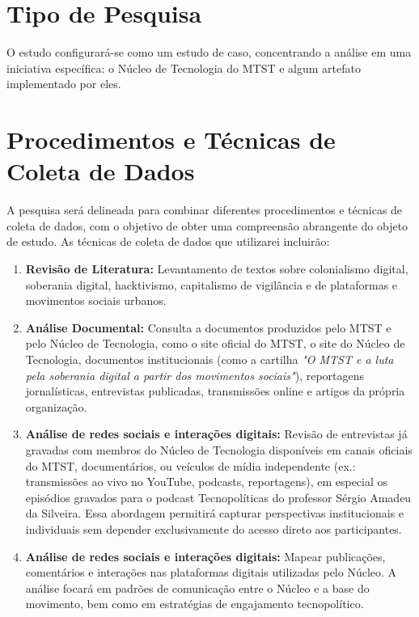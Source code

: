 \section{Tipo de Pesquisa}

O estudo configurará-se como um estudo de caso, concentrando a análise em uma iniciativa específica: o Núcleo de Tecnologia do MTST e algum artefato implementado por eles.

\section{Procedimentos e Técnicas de Coleta de Dados}

A pesquisa será delineada para combinar diferentes procedimentos e técnicas de coleta de dados, com o objetivo de obter uma compreensão abrangente do objeto de estudo. As técnicas de coleta de dados que utilizarei incluirão:

\begin{enumerate}

    \item \textbf{Revisão de Literatura:} \label{item:revisao} Levantamento de textos sobre colonialismo digital, soberania digital, hacktivismo, capitalismo de vigilância e de plataformas e movimentos sociais urbanos.

    \item \textbf{Análise Documental:}  \label{item:documental} Consulta a documentos produzidos pelo MTST e pelo Núcleo de Tecnologia, como o site oficial do MTST, o site do Núcleo de Tecnologia, documentos institucionais (como a cartilha \textit{"O MTST e a luta pela soberania digital a partir dos movimentos sociais"}), reportagens jornalísticas, entrevistas publicadas, transmissões online e artigos da própria organização. 

    \item \textbf{Análise de redes sociais e interações digitais:} \label{item:digitais-entrevistas} Revisão de entrevistas já gravadas com membros do Núcleo de Tecnologia disponíveis em canais oficiais do MTST, documentários, ou veículos de mídia independente (ex.: transmissões ao vivo no YouTube, podcasts, reportagens), em especial os episódios gravados para o podcast Tecnopolíticas do professor Sérgio Amadeu da Silveira. Essa abordagem permitirá capturar perspectivas institucionais e individuais sem depender exclusivamente do acesso direto aos participantes.

    \item \textbf{Análise de redes sociais e interações digitais:} \label{item:digitais-interacoes} Mapear publicações, comentários e interações nas plataformas digitais utilizadas pelo Núcleo. A análise focará em padrões de comunicação entre o Núcleo e a base do movimento, bem como em estratégias de engajamento tecnopolítico.
    
\end{enumerate}

